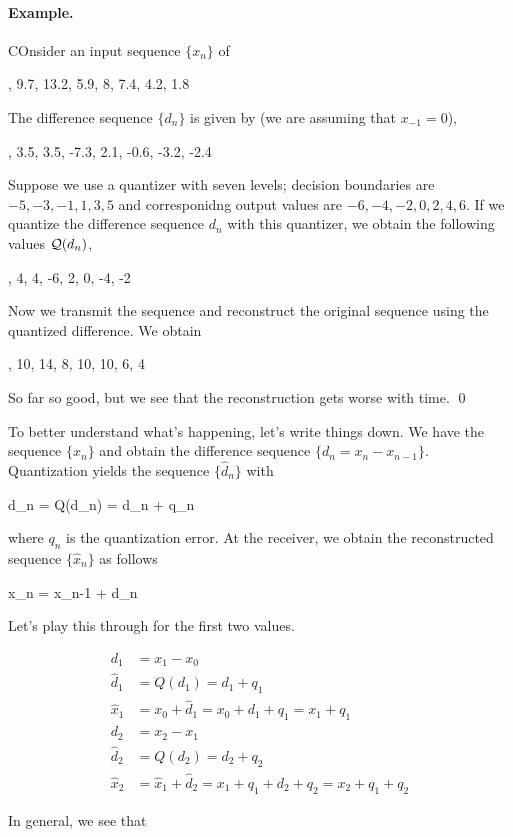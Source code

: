\paragraph{Example.} COnsider an input sequence $\{ x_n \}$ of

, 9.7, 13.2, 5.9, 8, 7.4, 4.2, 1.8
\eee

The difference sequence $\{ d_n \}$ is given by (we are assuming that $x_{-1} = 0$),

, 3.5, 3.5, -7.3, 2.1, -0.6, -3.2, -2.4
\eee

Suppose we use a quantizer with seven levels; decision boundaries are $-5, -3, -1, 1, 3, 5$ and corresponidng output values are $-6, -4, -2, 0, 2, 4, 6$. If we quantize the difference sequence $d_n$ with this quantizer, we obtain the following values $\mathcal{Q}(d_n)$,

, 4, 4, -6, 2, 0, -4, -2
\eee

Now we transmit the sequence and reconstruct the original sequence using the quantized difference. We obtain

, 10, 14, 8, 10, 10, 6, 4
\eee

So far so good, but we see that the reconstruction gets worse with time. \qed

To better understand what's happening, let's write things down. We have the sequence $\{ x_n\}$ and obtain the difference sequence $\{d_n  = x_n - x_{n-1}\}$. Quantization yields the sequence $\{ \hat d_n \}$ with

\bee
\hat d_n = Q(d_n) = d_n + q_n
\eee

where $q_n$ is the quantization error. At the receiver, we obtain the reconstructed sequence $\{ \hat x_n \}$ as follows

\bee
\hat x_n = \hat x_{n-1} + \hat d_n
\eee

Let's play this through for the first two values.

\begin{align*}
  d_1 &= x_1 - x_0 \\
  \hat d_1 &= Q(d_1) = d_1 + q_1 \\
  \hat x_1 &= x_0 + \hat d_1 = x_0 + d_1 + q_1 = x_1 + q_1 \\
  d_2 &= x_2 - x_1 \\
  \hat d_2 &= Q(d_2) = d_2 + q_2 \\
  \hat x_2 &= \hat x_1 + \hat d_2 = x_1 + q_1 + d_2 + q_2 = x_2 + q_1 + q_2
\end{align*}
             
In general, we see that

